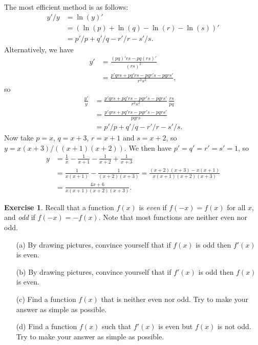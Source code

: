 \documentclass[a4paper]{amsart}
\theoremstyle{definition}
\newtheorem{exercise}{Exercise}[section]
\newenvironment{solution}{{\noindent \bf Solution:}}{}
\begin{document}
\begin{solution}
The most efficient method is as follows:
 \begin{align*}
  y'/y &= \ln(y)' \\
       &= (\ln(p)+\ln(q)-\ln(r)-\ln(s))' \\
       &= p'/p + q'/q - r'/r - s'/s.
 \end{align*}
 Alternatively, we have
 \begin{align*}
  y' &= \frac{(pq)'rs - pq(rs)'}{(rs)^2} \\
     &= \frac{p'qrs + pq'rs - pqr's - pqrs'}{r^2s^2},
 \end{align*}
 so
 \begin{align*}
  \frac{y'}{y} &= 
   \frac{p'qrs + pq'rs - pqr's - pqrs'}{r^2s^2} \, \frac{rs}{pq} \\
   &= \frac{p'qrs + pq'rs - pqr's - pqrs'}{pqrs} \\
   &= p'/p + q'/q - r'/r - s'/s.
 \end{align*}
 Now take $p=x$, $q=x+3$, $r=x+1$ and $s=x+2$, so
 $y=x(x+3)/((x+1)(x+2))$.  We then have $p'=q'=r'=s'=1$, so 
 \begin{align*}
   y &= \frac{1}{x} - \frac{1}{x+1} - \frac{1}{x+2} + \frac{1}{x+3}\\
     &= \frac{1}{x(x+1)} - \frac{1}{(x+2)(x+3)} 
      = \frac{(x+2)(x+3) - x(x+1)}{x(x+1)(x+2)(x+3)} \\
     &= \frac{4x+6}{x(x+1)(x+2)(x+3)}.
 \end{align*}
\end{solution}
\begin{exercise}\label{ex-evenodd}
Recall that a function $f(x)$ is \emph{even} if
 $f(-x)=f(x)$ for all $x$, and \emph{odd} if $f(-x)=-f(x)$.
 Note that most functions are neither even nor odd.
 \begin{itemize}
  \item[(a)] By drawing pictures, convince yourself that if
   $f(x)$ is odd then $f'(x)$ is even.  
  \item[(b)] By drawing pictures, convince yourself that if
   $f'(x)$ is odd then $f(x)$ is even.
  \item[(c)] Find a function $f(x)$ that is neither even nor
   odd.  Try to make your answer as simple as possible.
  \item[(d)] Find a function $f(x)$ such that $f'(x)$ is
   even but $f(x)$ is not odd.  Try to make your answer as
   simple as possible. 
 \end{itemize}
\end{exercise}
\end{document}
